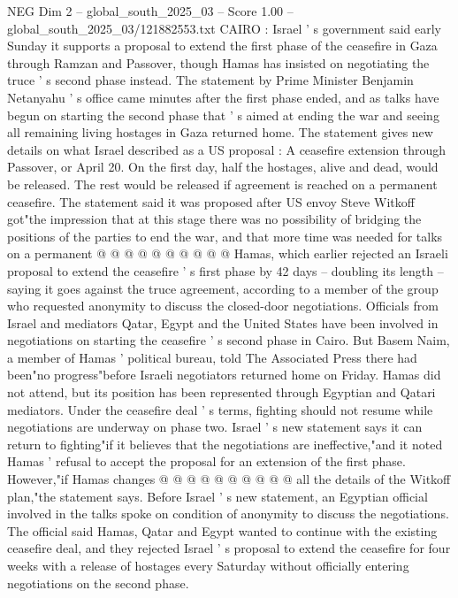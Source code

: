 \begin{textsample}{NEG Dim 2 – global\_south\_2025\_03 – Score 1.00 – global\_south\_2025\_03/121882553.txt}  \label{ex:f2_neg_158}
CAIRO : Israel ' s government said early Sunday it supports a proposal to extend the first phase of the ceasefire in Gaza through Ramzan and Passover, though Hamas has insisted on negotiating the truce ' s second phase instead.
The statement by Prime Minister Benjamin Netanyahu ' s office came minutes after the first phase ended, and as talks have begun on starting the second phase that ' s aimed at ending the war and seeing all remaining living hostages in Gaza returned home.
The statement gives new details on what Israel described as a US proposal : A ceasefire extension through Passover, or April 20.
On the first day, half the hostages, alive and dead, would be released.
The rest would be released if agreement is reached on a permanent ceasefire.
The statement said it was proposed after US envoy Steve Witkoff got"the impression that at this stage there was no possibility of bridging the positions of the parties to end the war, and that more time was needed for talks on a permanent @ @ @ @ @ @ @ @ @ @ Hamas, which earlier rejected an Israeli proposal to extend the ceasefire ' s first phase by 42 days -- doubling its length -- saying it goes against the truce agreement, according to a member of the group who requested anonymity to discuss the closed-door negotiations.
Officials from Israel and mediators Qatar, Egypt and the United States have been involved in negotiations on starting the ceasefire ' s second phase in Cairo.
But Basem Naim, a member of Hamas ' political bureau, told The Associated Press there had been"no progress"before Israeli negotiators returned home on Friday.
Hamas did not attend, but its position has been represented through Egyptian and Qatari mediators.
Under the ceasefire deal ' s terms, fighting should not resume while negotiations are underway on phase two.
Israel ' s new statement says it can return to fighting"if it believes that the negotiations are ineffective,"and it noted Hamas ' refusal to accept the proposal for an extension of the first phase.
However,"if Hamas changes @ @ @ @ @ @ @ @ @ @ all the details of the Witkoff plan,"the statement says.
Before Israel ' s new statement, an Egyptian official involved in the talks spoke on condition of anonymity to discuss the negotiations.
The official said Hamas, Qatar and Egypt wanted to continue with the existing ceasefire deal, and they rejected Israel ' s proposal to extend the ceasefire for four weeks with a release of hostages every Saturday without officially entering negotiations on the second phase.

\end{textsample}
